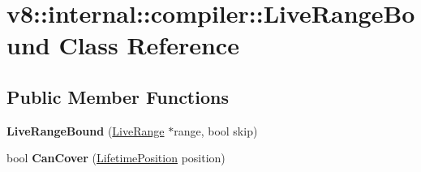 \hypertarget{classv8_1_1internal_1_1compiler_1_1_live_range_bound}{}\section{v8\+:\+:internal\+:\+:compiler\+:\+:Live\+Range\+Bound Class Reference}
\label{classv8_1_1internal_1_1compiler_1_1_live_range_bound}
\subsection*{Public Member Functions}
\begin{DoxyCompactItemize}
\item 
{\bfseries Live\+Range\+Bound} (\hyperlink{classv8_1_1internal_1_1compiler_1_1_live_range}{Live\+Range} $\ast$range, bool skip)\hypertarget{classv8_1_1internal_1_1compiler_1_1_live_range_bound_a245a3c9612ce8c1da5194c29b85a3378}{}\label{classv8_1_1internal_1_1compiler_1_1_live_range_bound_a245a3c9612ce8c1da5194c29b85a3378}

\item 
bool {\bfseries Can\+Cover} (\hyperlink{classv8_1_1internal_1_1compiler_1_1_lifetime_position}{Lifetime\+Position} position)\hypertarget{classv8_1_1internal_1_1compiler_1_1_live_range_bound_af620a1d0b1cbeb07467819aa01891a44}{}\label{classv8_1_1internal_1_1compiler_1_1_live_range_bound_af620a1d0b1cbeb07467819aa01891a44}

\end{DoxyCompactItemize}
